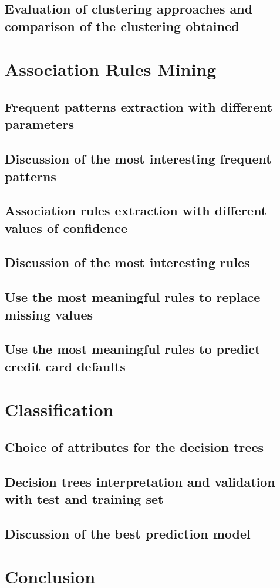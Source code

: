 \documentclass[11pt,a4paper]{report}
\begin{document}
\section{Evaluation of clustering approaches and comparison of the clustering obtained}

\chapter{Association Rules Mining}

\section{Frequent patterns extraction with different parameters}
\section{Discussion of the most interesting frequent patterns}
\section{Association rules extraction with different values of confidence}
\section{Discussion of the most interesting rules}
\section{Use the most meaningful rules to replace missing values}
\section{Use the most meaningful rules to predict credit card defaults}

\chapter{Classification}

\section{Choice of attributes for the decision trees}
\section{Decision trees interpretation and validation with test and training set}
\section{Discussion of the best prediction model}

\chapter{Conclusion}

\end{document}
